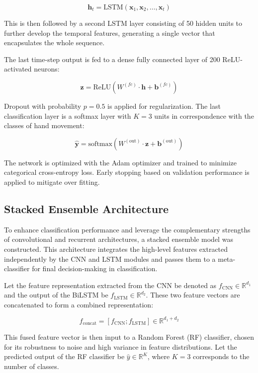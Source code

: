 \documentclass{elektr}
\begin{document}
\[
\mathbf{h}_t = \text{LSTM}(\mathbf{x}_1, \mathbf{x}_2, \ldots, \mathbf{x}_t)
\]

This is then followed by a second LSTM layer consisting of 50 hidden units to further develop the temporal features, generating a single vector that encapsulates the whole sequence.

The last time-step output is fed to a dense fully connected layer of 200 ReLU-activated neurons:

\[
\mathbf{z} = \text{ReLU}(W^{(fc)} \cdot \mathbf{h} + \mathbf{b}^{(fc)})
\]

Dropout with probability $p = 0.5$ is applied for regularization. The last classification layer is a softmax layer with $K = 3$ units in correspondence with the classes of hand movement:

\[
\hat{\mathbf{y}} = \text{softmax}(W^{(\text{out})} \cdot \mathbf{z} + \mathbf{b}^{(\text{out})})
\]

The network is optimized with the Adam optimizer and trained to minimize categorical cross-entropy loss. Early stopping based on validation performance is applied to mitigate over fitting.
\subsection{Stacked Ensemble Architecture}
To enhance classification performance and leverage the complementary strengths of convolutional and recurrent architectures, a stacked ensemble model was constructed. This architecture integrates the high-level features extracted independently by the CNN and LSTM modules and passes them to a meta-classifier for final decision-making in classification.

Let the feature representation extracted from the CNN be denoted as $f_{\text{CNN}} \in \mathbb{R}^{d_1}$ and the output of the BiLSTM be $f_{\text{LSTM}} \in \mathbb{R}^{d_2}$. These two feature vectors are concatenated to form a combined representation:

\begin{equation}
	f_{\text{concat}} = [f_{\text{CNN}} ; f_{\text{LSTM}}] \in \mathbb{R}^{d_1 + d_2}
\end{equation}

This fused feature vector is then input to a Random Forest (RF) classifier, chosen for its robustness to noise and high variance in feature distributions. Let the predicted output of the RF classifier be $\hat{y} \in \mathbb{R}^K$, where $K = 3$ corresponds to the number of classes.
\end{document}
